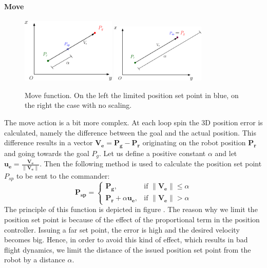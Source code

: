 \paragraph{Move} 

\begin{figure}[h]
\centering
 \includegraphics[width=0.4\textwidth]{move1.eps}\hspace{0.1\textwidth}
 \includegraphics[width=0.4\textwidth]{move2.eps}\\[1em]
 \caption[Move function.]{Move function. On the left the limited position set point in blue, on the right the case with no scaling.}
  \label{figure:move}
\end{figure}

The move action is a bit more complex. At each loop spin the 3D position error is calculated, namely the difference between the goal and the actual position.  This difference results in a vector $\boldsymbol{V_e} = \boldsymbol{P_g} - \boldsymbol{P_r}$ originating on the robot position $\boldsymbol{P_r}$ and going towards the goal $P_g$. Let us define a positive constant $\alpha$ and let $\boldsymbol{u_e} = 	\frac{\boldsymbol{V_e}}{\lVert\boldsymbol{V_e}\rVert}$. Then the following method is used to calculate the position set point $P_{sp}$ to be sent to the commander: 
\begin{equation}
\boldsymbol{P_{sp}} = 
\begin{cases}
    \boldsymbol{P_g}, & \text{if } \lVert\boldsymbol{V_e} \rVert \leq \alpha \\
    \boldsymbol{P_r} + \alpha \boldsymbol{u_e},&    \text{if } \lVert\boldsymbol{V_e}\rVert > \alpha
\end{cases}
\label{eq:move}
\end{equation}
The principle of this function is depicted in figure . The reason why we limit the position set point is because of the effect of the proportional term in the position controller. Issuing a far set point, the error is high and the desired velocity becomes big. Hence, in order to avoid this kind of effect, which results in bad flight dynamics, we limit the distance of the issued position set point from the robot by a distance $\alpha$.

